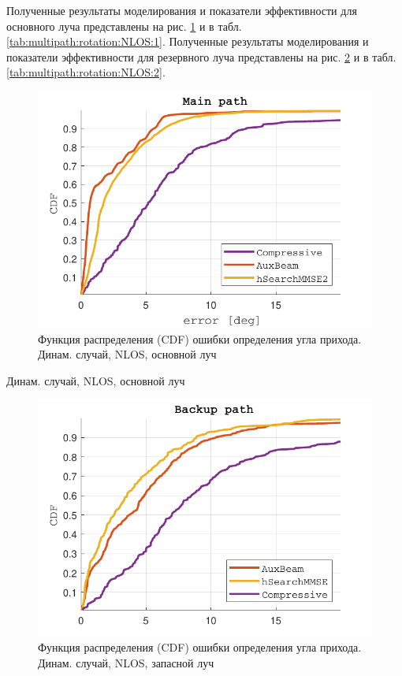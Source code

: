 Полученные результаты моделирования и показатели эффективности для основного луча представлены на
рис. \ref{fig:multipath:rotation:NLOS:1} и в табл. \ref{tab:multipath:rotation:NLOS:1}. 
Полученные результаты моделирования и показатели эффективности для резервного
луча представлены на рис. \ref{fig:multipath:rotation:NLOS:2} и в табл. \ref{tab:multipath:rotation:NLOS:2}.
\begin{figure}[H]
  \centering
  \includegraphics{results/rus/multipath-rotation-NLOS-1}
  \caption{Функция распределения (CDF) ошибки определения угла прихода. Динам. случай, NLOS, основной луч}
  \label{fig:multipath:rotation:NLOS:1}
\end{figure}

\begin{table}[H]
  \begin{center}
    \caption{Динам. случай, NLOS, основной луч}
    \label{tab:multipath:rotation:NLOS:1}
  \end{center}
\end{table}

\begin{figure}[H]
  \centering
  \includegraphics{results/rus/multipath-rotation-NLOS-2}
  \caption{Функция распределения (CDF) ошибки определения угла прихода. Динам. случай, NLOS, запасной луч}
  \label{fig:multipath:rotation:NLOS:2}
\end{figure}

